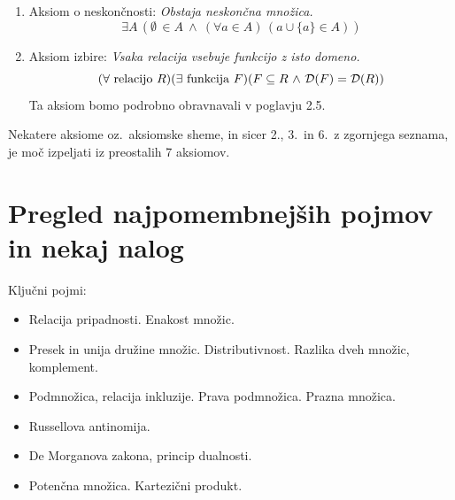 \documentclass[11pt,paper=b5,footinclude,headinclude]{scrbook} %
\def\inn {{~\wedge~}}
\def\sledi {{~\Rightarrow~}}
\def\cee {{~\Leftrightarrow~}}
\def\zgled{\noindent\textbf{\color{blue} Zgled: }}
\begin{document}
\begin{enumerate}
  \item Aksiom o neskončnosti: \emph{ Obstaja neskončna množica.}
$$\exists A\,(\emptyset \,\in A \inn (\forall a\in A)\, (a\cup \{a\}\in A))$$

\item Aksiom izbire: \emph{ Vsaka relacija vsebuje funkcijo z isto domeno.}
$$(\forall \textrm{ relacijo }R)(\exists \textrm{ funkcija }F)(F\subseteq R \inn {\cal D}(F) = {\cal D}(R))$$
Ta aksiom bomo podrobno obravnavali v poglavju 2.5.






\end{enumerate}

Nekatere aksiome oz.~aksiomske sheme, in sicer 2., 3.~in 6.~z zgornjega seznama, je moč izpeljati iz preostalih 7 aksiomov.

\section{Pregled najpomembnejših pojmov in nekaj nalog}

Ključni pojmi:
\begin{itemize}
  \item Relacija pripadnosti. Enakost množic.
  \item Presek in unija družine množic. Distributivnost. Razlika dveh množic, komplement.
  \item Podmnožica, relacija inkluzije. Prava podmnožica. Prazna množica.
  \item Russellova antinomija.
  \item De Morganova zakona, princip dualnosti.
  \item Potenčna množica. Kartezični produkt.
\end{itemize}
\end{document}
